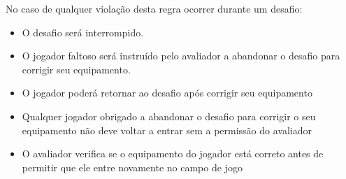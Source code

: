 No caso de qualquer violação desta regra ocorrer durante um desafio:

\begin{itemize}
  \item O desafio será interrompido.
  \item O jogador faltoso será instruído pelo avaliador a abandonar o desafio para corrigir seu equipamento.
  \item O jogador poderá retornar ao desafio após corrigir seu equipamento
  \item Qualquer jogador obrigado a abandonar o desafio para corrigir o seu equipamento não deve voltar a entrar sem a permissão do avaliador
  \item O avaliador verifica se o equipamento do jogador está correto antes de permitir que ele entre novamente no campo de jogo
\end{itemize}